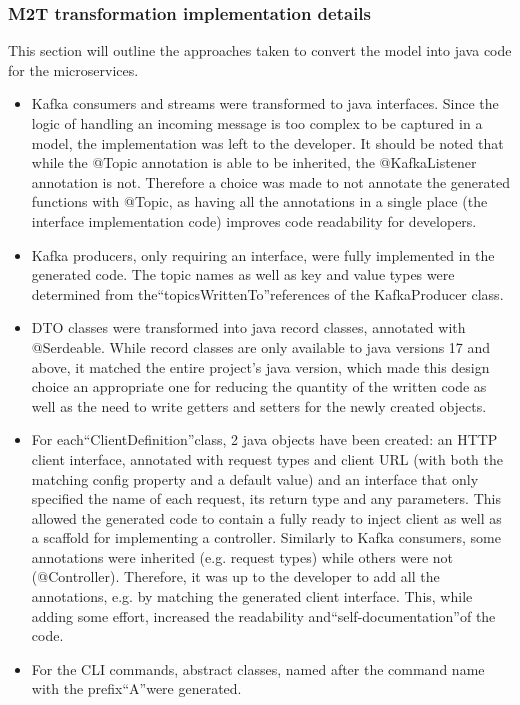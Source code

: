 \documentclass[parskip=full]{article}
\begin{document}
    \subsubsection{M2T transformation implementation details}
    This section will outline the approaches taken to convert the model into java code for the microservices.
    \begin{itemize}
\item	Kafka consumers and streams were transformed to java interfaces.
Since the logic of handling an incoming message is too complex to be captured in a model, the implementation was left to the developer.
It should be noted that while the @Topic annotation is able to be inherited, the @KafkaListener annotation is not.
Therefore a choice was made to not annotate the generated functions with @Topic, as having all the annotations in a single place (the interface implementation code) improves code readability for developers.
\item	Kafka producers, only requiring an interface, were fully implemented in the generated code.
The topic names as well as key and value types were determined from the``topicsWrittenTo''references of the KafkaProducer class.
\item	DTO classes were transformed into java record classes, annotated with @Serdeable.
While record classes are only available to java versions 17 and above, it matched the entire project's java version, which made this design choice an appropriate one for reducing the quantity of the written code as well as the need to write getters and setters for the newly created objects.
\item	For each``ClientDefinition''class, 2 java objects have been created: an HTTP client interface, annotated with request types and client URL (with both the matching config property and a default value) and an interface that only specified the name of each request, its return type and any parameters.
This allowed the generated code to contain a fully ready to inject client as well as a scaffold for implementing a controller.
Similarly to Kafka consumers, some annotations were inherited (e.g. request types) while others were not (@Controller).
Therefore, it was up to the developer to add all the annotations, e.g. by matching the generated client interface.
This, while adding some effort, increased the readability and``self-documentation''of the code.
\item	For the CLI commands, abstract classes, named after the command name with the prefix``A''were generated.

\end{itemize}
\end{document}
